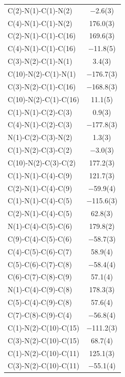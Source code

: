 \begin{center}
\tablefirsthead{%
\toprule}
\tablelasttail{\bottomrule}
{\footnotesize \singlespacing
\begin{supertabular}{p{1.5in}c}
C(2)-N(1)-C(1)-N(2)&$-$2.6(3)\\
C(4)-N(1)-C(1)-N(2)&176.0(3)\\
C(2)-N(1)-C(1)-C(16)&169.6(3)\\
C(4)-N(1)-C(1)-C(16)&$-$11.8(5)\\
C(3)-N(2)-C(1)-N(1)&3.4(3)\\
C(10)-N(2)-C(1)-N(1)&$-$176.7(3)\\
C(3)-N(2)-C(1)-C(16)&$-$168.8(3)\\
C(10)-N(2)-C(1)-C(16)&11.1(5)\\
C(1)-N(1)-C(2)-C(3)&0.9(3)\\
C(4)-N(1)-C(2)-C(3)&$-$177.8(3)\\
N(1)-C(2)-C(3)-N(2)&1.3(3)\\
C(1)-N(2)-C(3)-C(2)&$-$3.0(3)\\
C(10)-N(2)-C(3)-C(2)&177.2(3)\\
C(1)-N(1)-C(4)-C(9)&121.7(3)\\
C(2)-N(1)-C(4)-C(9)&$-$59.9(4)\\
C(1)-N(1)-C(4)-C(5)&$-$115.6(3)\\
C(2)-N(1)-C(4)-C(5)&62.8(3)\\
N(1)-C(4)-C(5)-C(6)&179.8(2)\\
C(9)-C(4)-C(5)-C(6)&$-$58.7(3)\\
C(4)-C(5)-C(6)-C(7)&58.9(4)\\
C(5)-C(6)-C(7)-C(8)&$-$58.4(4)\\
C(6)-C(7)-C(8)-C(9)&57.1(4)\\
N(1)-C(4)-C(9)-C(8)&178.3(3)\\
C(5)-C(4)-C(9)-C(8)&57.6(4)\\
C(7)-C(8)-C(9)-C(4)&$-$56.8(4)\\
C(1)-N(2)-C(10)-C(15)&$-$111.2(3)\\
C(3)-N(2)-C(10)-C(15)&68.7(4)\\
C(1)-N(2)-C(10)-C(11)&125.1(3)\\
C(3)-N(2)-C(10)-C(11)&$-$55.1(4)\\

\end{supertabular}}
\end{center}

